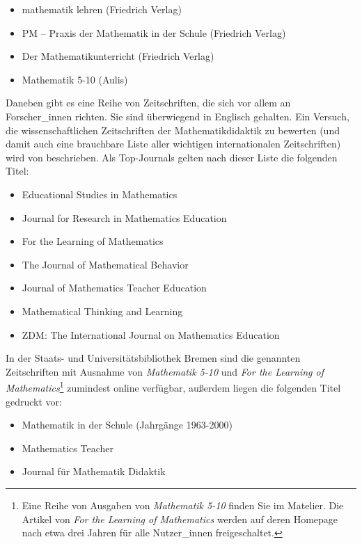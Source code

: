 \documentclass[ngerman,oneside,12pt,a4paper]{scrbook}
\begin{document}
\begin{itemize}
\item
  mathematik lehren (Friedrich Verlag)
\item
  PM -- Praxis der Mathematik in der Schule (Friedrich Verlag)
\item
  Der Mathematikunterricht (Friedrich Verlag)
\item
  Mathematik 5-10 (Aulis)
\end{itemize}

Daneben gibt es eine Reihe von Zeitschriften, die sich vor allem an
Forscher\_innen richten. Sie sind überwiegend in Englisch gehalten. Ein
Versuch, die wissenschaftlichen Zeitschriften der Mathematikdidaktik zu
bewerten (und damit auch eine brauchbare Liste aller wichtigen
internationalen Zeitschriften) wird von \textcite{toerner2012}
beschrieben. Als Top-Journals gelten nach dieser Liste die folgenden
Titel:

\begin{itemize}
\item
  Educational Studies in Mathematics
\item
  Journal for Research in Mathematics Education
\item
  For the Learning of Mathematics
\item
  The Journal of Mathematical Behavior
\item
  Journal of Mathematics Teacher Education
\item
  Mathematical Thinking and Learning
\item
  ZDM: The International Journal on Mathematics Education
\end{itemize}

In der Staats- und Universitätsbibliothek Bremen sind die genannten
Zeitschriften mit Ausnahme von \emph{Mathematik 5-10} und \emph{For the
Learning of Mathematics}\footnote{Eine Reihe von Ausgaben von
  \emph{Mathematik 5-10} finden Sie im Matelier. Die Artikel von
  \emph{For the Learning of Mathematics} werden auf deren Homepage nach
  etwa drei Jahren für alle Nutzer\_innen freigeschaltet.} zumindest
online verfügbar, außerdem liegen die folgenden Titel gedruckt vor:

\begin{itemize}
\item
  Mathematik in der Schule (Jahrgänge 1963-2000)
\item
  Mathematics Teacher
\item
  Journal für Mathematik Didaktik
\end{itemize}
\end{document}
